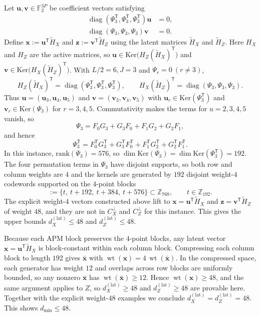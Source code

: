 \documentclass[a4paper,onecolumn,11pt,accepted=2026-08-03]{quantumarticle}
\newcommand{\Ftwo}{\mathbb{F}_2}
\newcommand{\Z}{\mathbb{Z}}
\newcommand{\Ker}{\mathrm{Ker}}
\newcommand{\Hres}{\tilde{H}}
\DeclareMathOperator{\diag}{diag}
\DeclareMathOperator{\wt}{wt}
\renewcommand\[{\begin{equation}}
\renewcommand\]{\end{equation}}
\theoremstyle{definition}
\begin{document}
Let $\boldsymbol{u},\boldsymbol{v}\in\Ftwo^{3P}$ be coefficient vectors satisfying
\begin{align*}
\diag(\Psi_3^{\mathsf T},\Psi_3^{\mathsf T},\Psi_3^{\mathsf T})\boldsymbol{u}&=0,\\
\diag(\Psi_3,\Psi_3,\Psi_3)\boldsymbol{v}&=0.
\end{align*}
Define $\boldsymbol{x}:=\boldsymbol{u}^{\mathsf T}\Hres_X$ and $\boldsymbol{z}:=\boldsymbol{v}^{\mathsf T}\Hres_Z$ using the latent matrices $\Hres_X$ and $\Hres_Z$. Here $H_X$ and $H_Z$ are the active matrices, so
$\boldsymbol{u}\in\Ker\!\bigl(H_Z(\Hres_X)^{\mathsf T}\bigr)$ and
$\boldsymbol{v}\in\Ker\!\bigl(H_X(\Hres_Z)^{\mathsf T}\bigr)$.
With $L/2=6,J=3$ and $\Psi_r=0\ (r\neq 3)$,
\[
H_Z(\Hres_X)^{\mathsf T}=\diag(\Psi_3^{\mathsf T},\Psi_3^{\mathsf T},\Psi_3^{\mathsf T}),\qquad
H_X(\Hres_Z)^{\mathsf T}=\diag(\Psi_3,\Psi_3,\Psi_3).
\label{eq:block-diag-psi3}
\]
Thus $\boldsymbol{u}=(\boldsymbol{u}_3,\boldsymbol{u}_4,\boldsymbol{u}_5)$ and
$\boldsymbol{v}=(\boldsymbol{v}_3,\boldsymbol{v}_4,\boldsymbol{v}_5)$ with
$\boldsymbol{u}_r\in\Ker(\Psi_3^{\mathsf T})$ and $\boldsymbol{v}_r\in\Ker(\Psi_3)$ for $r=3,4,5$.
Commutativity makes the terms for $u=2,3,4,5$ vanish, so
\[
\Psi_3=F_0G_3+G_3F_0+F_1G_2+G_2F_1,
\]
and hence
\[
\Psi_3^{\mathsf T}=F_0^{\mathsf T}G_3^{\mathsf T}+G_3^{\mathsf T}F_0^{\mathsf T}
+F_1^{\mathsf T}G_2^{\mathsf T}+G_2^{\mathsf T}F_1^{\mathsf T}.
\]
In this instance, $\mathrm{rank}(\Psi_3)=576$, so $\dim \Ker(\Psi_3)=\dim \Ker(\Psi_3^{\mathsf T})=192$.
The four permutation terms in $\Psi_3$ have disjoint supports, so both row and column weights are $4$ and the kernels are generated by $192$ disjoint weight-$4$ codewords supported on the $4$-point blocks
\[
[t]:=\{t,\ t+192,\ t+384,\ t+576\}\subset\Z_{768},\qquad t\in\Z_{192}.
\]
The explicit weight-$4$ vectors constructed above lift to $\boldsymbol{x}=\boldsymbol{u}^{\mathsf T}\Hres_X$ and $\boldsymbol{z}=\boldsymbol{v}^{\mathsf T}\Hres_Z$ of weight $48$, and they are not in $C_X^{\perp}$ and $C_Z^{\perp}$ for this instance. This gives the upper bounds $d_X^{(\mathrm{lat})} \le 48$ and $d_Z^{(\mathrm{lat})} \le 48$.

Because each APM block preserves the $4$-point blocks, any latent vector $\boldsymbol{x}=\boldsymbol{u}^{\mathsf T}\Hres_X$
is block-constant within each column block. Compressing each column block to length $192$ gives $\bar{\boldsymbol{x}}$ with
$\wt(\boldsymbol{x})=4\,\wt(\bar{\boldsymbol{x}})$. In the compressed space, each generator has weight $12$ and overlaps across
row blocks are uniformly bounded, so any nonzero $\bar{\boldsymbol{x}}$ has $\wt(\bar{\boldsymbol{x}})\ge 12$.
Hence $\wt(\boldsymbol{x})\ge 48$, and the same argument applies to $Z$, so $d_X^{(\mathrm{lat})}\ge 48$ and
$d_Z^{(\mathrm{lat})}\ge 48$ are provable here. Together with the explicit weight-$48$ examples we conclude
$d_X^{(\mathrm{lat})}=d_Z^{(\mathrm{lat})}=48$.
This shows $d_{\min}\le 48$. 
\end{document}
